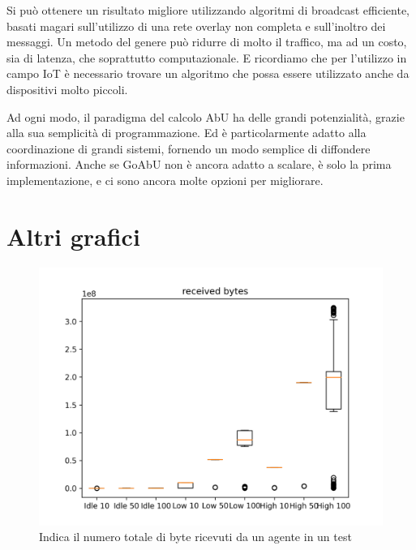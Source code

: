 \documentclass[12pt, a4paper]{article}
\begin{document}
Si può ottenere un risultato migliore utilizzando algoritmi di broadcast efficiente, basati magari sull'utilizzo di una rete overlay non completa e sull'inoltro dei messaggi.
Un metodo del genere può ridurre di molto il traffico, ma ad un costo, sia di latenza, che soprattutto computazionale. E ricordiamo che per l'utilizzo in campo IoT è necessario trovare un algoritmo che possa essere utilizzato anche da dispositivi molto piccoli.

Ad ogni modo, il paradigma del calcolo AbU ha delle grandi potenzialità, grazie alla sua semplicità di programmazione. Ed è particolarmente adatto alla coordinazione di grandi sistemi, fornendo un modo semplice di diffondere informazioni.
Anche se GoAbU non è ancora adatto a scalare, è solo la prima implementazione, e ci sono ancora molte opzioni per migliorare.




\newpage
\appendix

\section{Altri grafici}\label{appendix:grafici}

\begin{figure}[H]
    \includegraphics[width=\linewidth, height=0.35\textheight, keepaspectratio]{graphs/received bytes.png}
    \caption{Indica il numero totale di byte ricevuti da un agente in un test}
    \label{fig:rb}
\end{figure}
\end{document}
